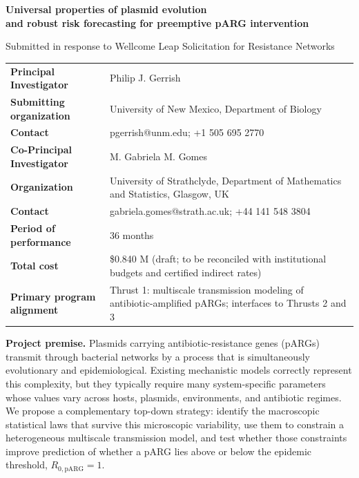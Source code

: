 \documentclass[12pt,a4paper]{article}
\newcommand{\RpARG}{R_{0,\mathrm{pARG}}}
\begin{document}
\thispagestyle{empty}
\begin{center}
{\Large\bfseries Universal properties of plasmid evolution\\[0.2em]
and robust risk forecasting for preemptive pARG intervention}\par
\vspace{0.8em}
{\large Submitted in response to Wellcome Leap Solicitation for Resistance Networks}\par
\vspace{1.2em}
\end{center}

\begin{tabularx}{\textwidth}{@{}p{}X@{}}
\textbf{Principal Investigator} & Philip J. Gerrish\\
\textbf{Submitting organization} & University of New Mexico, Department of Biology\\
\textbf{Contact} & pgerrish@unm.edu; +1 505 695 2770\\[0.35em]
\textbf{Co-Principal Investigator} & M. Gabriela M. Gomes\\
\textbf{Organization} & University of Strathclyde, Department of Mathematics and Statistics, Glasgow, UK\\
\textbf{Contact} & gabriela.gomes@strath.ac.uk; +44 141 548 3804\\[0.35em]
\textbf{Period of performance} & 36 months\\
\textbf{Total cost} & \$0.840 M (draft; to be reconciled with institutional budgets and certified indirect rates)\\
\textbf{Primary program alignment} & Thrust 1: multiscale transmission modeling of antibiotic-amplified pARGs; interfaces to Thrusts 2 and 3\\
\end{tabularx}

\vfill
\textbf{Project premise.} Plasmids carrying antibiotic-resistance genes (pARGs) transmit through bacterial networks by a process that is simultaneously evolutionary and epidemiological. Existing mechanistic models correctly represent this complexity, but they typically require many system-specific parameters whose values vary across hosts, plasmids, environments, and antibiotic regimes. We propose a complementary top-down strategy: identify the macroscopic statistical laws that survive this microscopic variability, use them to constrain a heterogeneous multiscale transmission model, and test whether those constraints improve prediction of whether a pARG lies above or below the epidemic threshold, $\RpARG=1$.
\end{document}
